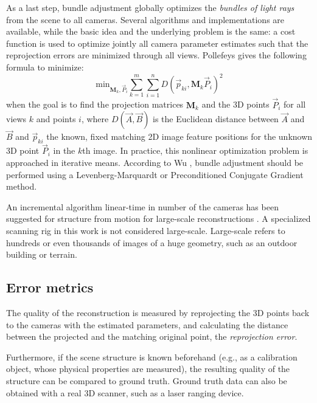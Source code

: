 As a last step, bundle adjustment globally optimizes the \emph{bundles of light rays} from the scene to all cameras.
Several algorithms and implementations are available, while the basic idea and the underlying problem is the same:
a cost function is used to optimize jointly all camera parameter estimates such that the reprojection errors are minimized through all views.
Pollefeys \cite{pollefeys2004visual} gives the following formula to minimize:
\begin{equation}
	\text{min}_{\bm M_k, \vec P_i} \sum_{k=1}^m \sum_{i=1}^n D(\vec p_{ki}, \bm M_k \vec P_i)^2
\end{equation}
when the goal is to find the projection matrices $\bm M_k$ and the 3D points $\vec P_i$ for all views $k$ and points $i$, where $D(\vec A,\vec B)$ is the Euclidean distance between $\vec A$ and $\vec B$ and $\vec p_{ki}$ the known, fixed matching 2D image feature positions for the unknown 3D point $\vec P_i$ in the $k$th image.
In practice, this nonlinear optimization problem is approached in iterative means.
According to Wu \cite{wu2013towards}, bundle adjustment should be performed using a Levenberg-Marquardt or Preconditioned Conjugate Gradient method.

An incremental algorithm linear-time in number of the cameras has been suggested for structure from motion for large-scale reconstructions \cite{wu2013towards}.
A specialized scanning rig in this work is not considered large-scale.
Large-scale refers to hundreds or even thousands of images of a huge geometry, such as an outdoor building or terrain.


\subsection{Error metrics} %

The quality of the reconstruction is measured by reprojecting the 3D points back to the cameras with the estimated parameters, and calculating the distance between the projected and the matching original point, the \emph{reprojection error}. \cite{hartley03multiview}

Furthermore, if the scene structure is known beforehand (e.g., as a calibration object, whose physical properties are measured), the resulting quality of the structure can be compared to ground truth.
Ground truth data can also be obtained with a real 3D scanner, such as a laser ranging device. %

